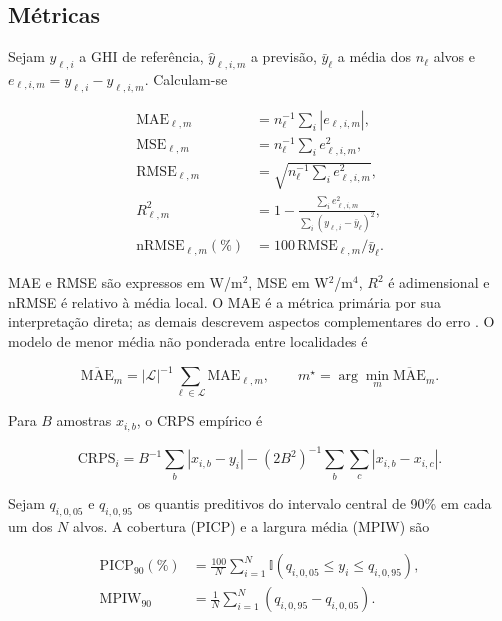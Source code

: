 \documentclass[10pt,conference,a4paper]{IEEEtran}
\begin{document}
\subsection{Métricas}

Sejam $y_{\ell,i}$ a GHI de referência, $\widehat y_{\ell,i,m}$ a previsão,
$\bar y_\ell$ a média dos $n_\ell$ alvos e
$e_{\ell,i,m}=y_{\ell,i}-\widehat y_{\ell,i,m}$. Calculam-se

\begin{align}
 \mathrm{MAE}_{\ell,m}
 &=n_\ell^{-1}\sum_i|e_{\ell,i,m}|,\label{eq:mae}\\
 \mathrm{MSE}_{\ell,m}
 &=n_\ell^{-1}\sum_i e_{\ell,i,m}^2,\label{eq:mse}\\
 \mathrm{RMSE}_{\ell,m}
 &=\sqrt{n_\ell^{-1}\sum_i e_{\ell,i,m}^2},\label{eq:rmse}\\
 R^2_{\ell,m}
 &=1-\frac{\sum_i e_{\ell,i,m}^2}
 {\sum_i(y_{\ell,i}-\bar y_\ell)^2},\label{eq:r2}\\
 \mathrm{nRMSE}_{\ell,m}(\%)
 &=100\,\mathrm{RMSE}_{\ell,m}/\bar y_\ell.\label{eq:nrmse}
\end{align}

MAE e RMSE são expressos em W/m$^2$, MSE em W$^2$/m$^4$, $R^2$ é
adimensional e nRMSE é relativo à média local. O MAE é a métrica primária por
sua interpretação direta; as demais descrevem aspectos complementares do erro
\cite{hyndman2006}. O modelo de menor média não ponderada entre localidades é

\begin{equation}
 \overline{\mathrm{MAE}}_m=|\mathcal L|^{-1}\sum_{\ell\in\mathcal L}
 \mathrm{MAE}_{\ell,m},\qquad
 m^\star=\arg\min_m\overline{\mathrm{MAE}}_m.
 \label{eq:macro}
\end{equation}

Para $B$ amostras $x_{i,b}$, o CRPS empírico é

\begin{equation}
 \mathrm{CRPS}_i=B^{-1}\sum_b|x_{i,b}-y_i|
 -(2B^2)^{-1}\sum_b\sum_c|x_{i,b}-x_{i,c}|.
 \label{eq:crps}
\end{equation}

Sejam $q_{i,0{,}05}$ e $q_{i,0{,}95}$ os quantis preditivos do intervalo
central de 90\% em cada um dos $N$ alvos. A cobertura (PICP) e a largura média
(MPIW) são

\begin{align}
 \mathrm{PICP}_{90}(\%)
 &=\frac{100}{N}\sum_{i=1}^{N}
 \mathbb I(q_{i,0{,}05}\le y_i\le q_{i,0{,}95}),\label{eq:picp}\\
 \mathrm{MPIW}_{90}
 &=\frac{1}{N}\sum_{i=1}^{N}
 (q_{i,0{,}95}-q_{i,0{,}05}).\label{eq:mpiw}
\end{align}
\end{document}
